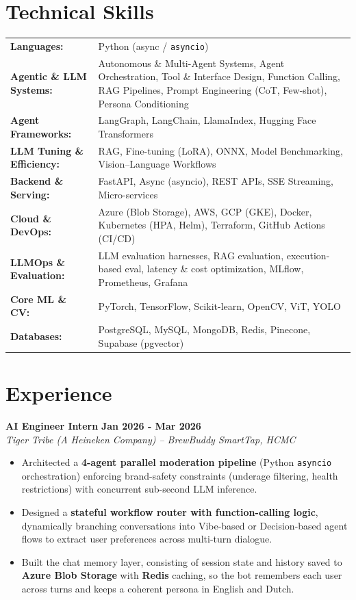 \documentclass[a4paper,10pt]{article}
\begin{document}
\section{Technical Skills}
\begin{tabularx}{\textwidth}{@{}l X@{}}
\textbf{Languages:} & Python (async / \texttt{asyncio}) \\
\textbf{Agentic \& LLM Systems:} & Autonomous \& Multi-Agent Systems, Agent Orchestration, Tool \& Interface Design, Function Calling, RAG Pipelines, Prompt Engineering (CoT, Few-shot), Persona Conditioning \\
\textbf{Agent Frameworks:} & LangGraph, LangChain, LlamaIndex, Hugging Face Transformers \\
\textbf{LLM Tuning \& Efficiency:} & RAG, Fine-tuning (LoRA), ONNX, Model Benchmarking, Vision–Language Workflows \\
\textbf{Backend \& Serving:} & FastAPI, Async (asyncio), REST APIs, SSE Streaming, Micro-services \\
\textbf{Cloud \& DevOps:} & Azure (Blob Storage), AWS, GCP (GKE), Docker, Kubernetes (HPA, Helm), Terraform, GitHub Actions (CI/CD) \\
\textbf{LLMOps \& Evaluation:} & LLM evaluation harnesses, RAG evaluation, execution-based eval, latency \& cost optimization, MLflow, Prometheus, Grafana \\
\textbf{Core ML \& CV:} & PyTorch, TensorFlow, Scikit-learn, OpenCV, ViT, YOLO \\
\textbf{Databases:} & PostgreSQL, MySQL, MongoDB, Redis, Pinecone, Supabase (pgvector) \\
\end{tabularx}

\section{Experience}

\textbf{AI Engineer Intern} \hfill \textbf{Jan 2026 - Mar 2026} \\
\textit{Tiger Tribe (A Heineken Company) -- BrewBuddy SmartTap, HCMC} \\
\vspace{-0.3em}
\begin{itemize}[leftmargin=1.2em, itemsep=0.05em, parsep=0pt, topsep=0pt]
    \item Architected a \textbf{4-agent parallel moderation pipeline} (Python \texttt{asyncio} orchestration) enforcing brand-safety constraints (underage filtering, health restrictions) with concurrent sub-second LLM inference.
    \item Designed a \textbf{stateful workflow router with function-calling logic}, dynamically branching conversations into Vibe-based or Decision-based agent flows to extract user preferences across multi-turn dialogue.
    \item Built the chat memory layer, consisting of session state and history saved to \textbf{Azure Blob Storage} with \textbf{Redis} caching, so the bot remembers each user across turns and keeps a coherent persona in English and Dutch.
\end{itemize}
\end{document}
